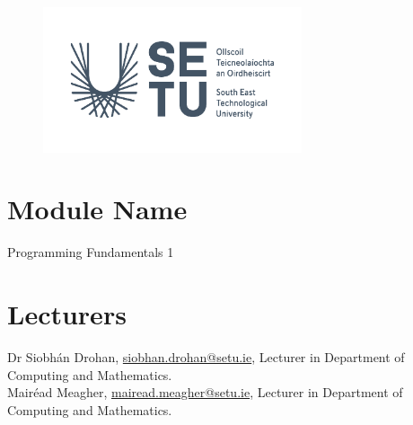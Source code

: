 \documentclass{article}
\begin{document}
\vspace{-.5cm}
    \begin{figure}[h]
    
        \centering
        \includegraphics[width=3in]{img/RGB.png}
    \end{figure}
\thispagestyle{empty} 
\pagebreak
\tableofcontents
\thispagestyle{empty} 
\pagebreak
{}
\section{Module Name}   
Programming  Fundamentals 1 \\
\section{Lecturers}
Dr Siobh\'an Drohan, \href{mailto:siobhan.drohan@setu.ie}{siobhan.drohan@setu.ie}, Lecturer in Department of Computing and Mathematics.\\
Mair\'ead Meagher, \href{mailto:mairead.meagher@setu.ie}{mairead.meagher@setu.ie}, Lecturer in Department of Computing and Mathematics.\\
\end{document}
